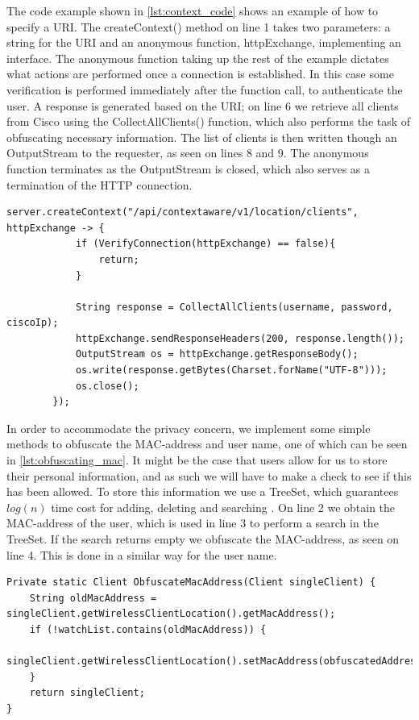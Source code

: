 The code example shown in \cref{lst:context_code} shows an example of how to specify a URI. The createContext() method on line 1 takes two parameters: a string for the URI and an anonymous function, httpExchange, implementing an interface. The anonymous function taking up the rest of the example dictates what actions are performed once a connection is established. In this case some verification is performed immediately after the function call, to authenticate the user. A response is generated based on the URI; on line 6 we retrieve all clients from Cisco using the CollectAllClients() function, which also performs the task of obfuscating necessary information. The list of clients is then written though an OutputStream to the requester, as seen on lines 8 and 9. The anonymous function terminates as the OutputStream is closed, which also serves as a termination of the HTTP connection. 

\begin{lstlisting}[caption={Adding a URI},label={lst:context_code},language=inc_Java]
server.createContext("/api/contextaware/v1/location/clients", httpExchange -> {
            if (VerifyConnection(httpExchange) == false){
                return;
            }

            String response = CollectAllClients(username, password, ciscoIp);
            httpExchange.sendResponseHeaders(200, response.length());
            OutputStream os = httpExchange.getResponseBody();
            os.write(response.getBytes(Charset.forName("UTF-8")));
            os.close();
        });
\end{lstlisting}

In order to accommodate the privacy concern, we implement some simple methods to obfuscate the MAC-address and user name, one of which can be seen in \cref{lst:obfuscating_mac}. It might be the case that users allow for us to store their personal information, and as such we will have to make a check to see if this has been allowed. To store this information we use a TreeSet, which guarantees $log(n)$ time cost for adding, deleting and searching \cite{treeset}. On line 2 we obtain the MAC-address of the user, which is used in line 3 to perform a search in the TreeSet. If the search returns empty we obfuscate the MAC-address, as seen on line 4. This is done in a similar way for the user name.

\begin{lstlisting}[caption={Obfuscating mac-address},label={lst:obfuscating_mac},language=inc_Java]
Private static Client ObfuscateMacAddress(Client singleClient) {
    String oldMacAddress = singleClient.getWirelessClientLocation().getMacAddress();
    if (!watchList.contains(oldMacAddress)) {
        singleClient.getWirelessClientLocation().setMacAddress(obfuscatedAddress);
    }
    return singleClient;
}
\end{lstlisting}

